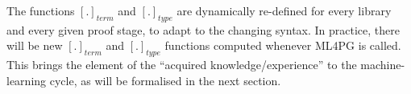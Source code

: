 The functions $[.]_{term}$ and $[.]_{type}$ are dynamically re-defined for every 
library and every given proof stage, to adapt to the changing syntax.
In practice, there will be  %
new $[.]_{term}$ and $[.]_{type}$ functions computed whenever ML4PG is called.
This
brings the element of the ``acquired knowledge/experience'' to the machine-learning cycle, as will be formalised in the next section.






